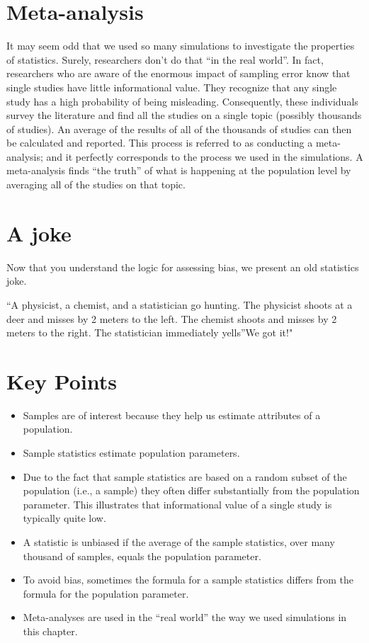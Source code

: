 \documentclass[
]{krantz}
\renewenvironment{quote}{\begin{VF}}{\end{VF}}
\begin{document}
\hypertarget{meta-analysis}{%
\section{Meta-analysis}\label{meta-analysis}}

It may seem odd that we used so many simulations to investigate the properties of statistics. Surely, researchers don't do that ``in the real world''. In fact, researchers who are aware of the enormous impact of sampling error know that single studies have little informational value. They recognize that any single study has a high probability of being misleading. Consequently, these individuals survey the literature and find all the studies on a single topic (possibly thousands of studies). An average of the results of all of the thousands of studies can then be calculated and reported. This process is referred to as conducting a meta-analysis; and it perfectly corresponds to the process we used in the simulations. A meta-analysis finds ``the truth'' of what is happening at the population level by averaging all of the studies on that topic.

\hypertarget{a-joke}{%
\section{A joke}\label{a-joke}}

Now that you understand the logic for assessing bias, we present an old statistics joke.

\begin{quote}
``A physicist, a chemist, and a statistician go hunting. The physicist shoots at a deer and misses by 2 meters to the left. The chemist shoots and misses by 2 meters to the right. The statistician immediately yells''We got it!"
\end{quote}

\hypertarget{key-points}{%
\section{Key Points}\label{key-points}}

\begin{itemize}
\item
  Samples are of interest because they help us estimate attributes of a population.
\item
  Sample statistics estimate population parameters.
\item
  Due to the fact that sample statistics are based on a random subset of the population (i.e., a sample) they often differ substantially from the population parameter. This illustrates that informational value of a single study is typically quite low.
\item
  A statistic is unbiased if the average of the sample statistics, over many thousand of samples, equals the population parameter.
\item
  To avoid bias, sometimes the formula for a sample statistics differs from the formula for the population parameter.
\item
  Meta-analyses are used in the ``real world'' the way we used simulations in this chapter.
\end{itemize}
\end{document}
